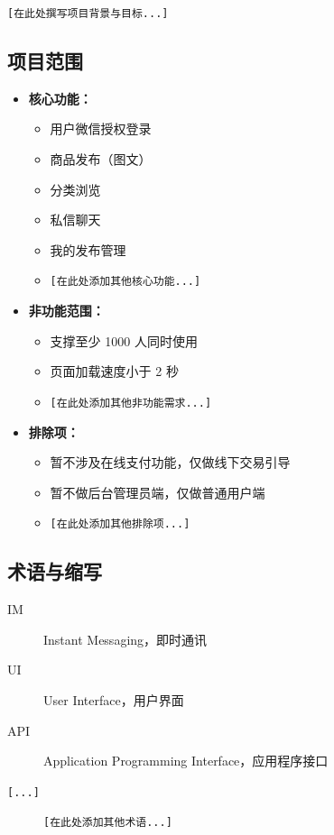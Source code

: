 \documentclass[12pt]{ctexart}
\begin{document}
\texttt{[在此处撰写项目背景与目标...]}

\subsection{项目范围}
\begin{itemize}
    \item \textbf{核心功能：}
    \begin{itemize}
        \item 用户微信授权登录
        \item 商品发布（图文）
        \item 分类浏览
        \item 私信聊天
        \item 我的发布管理
        \item \texttt{[在此处添加其他核心功能...]}
    \end{itemize}
    
    \item \textbf{非功能范围：}
    \begin{itemize}
        \item 支撑至少 1000 人同时使用
        \item 页面加载速度小于 2 秒
        \item \texttt{[在此处添加其他非功能需求...]}
    \end{itemize}
    
    \item \textbf{排除项：}
    \begin{itemize}
        \item 暂不涉及在线支付功能，仅做线下交易引导
        \item 暂不做后台管理员端，仅做普通用户端
        \item \texttt{[在此处添加其他排除项...]}
    \end{itemize}
\end{itemize}

\subsection{术语与缩写}
\begin{description}
    \item[IM] Instant Messaging，即时通讯
    \item[UI] User Interface，用户界面
    \item[API] Application Programming Interface，应用程序接口
    \item[\texttt{[...]}] \texttt{[在此处添加其他术语...]}
\end{description}
\end{document}
